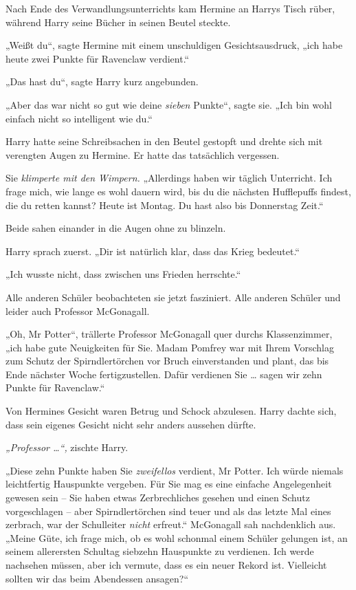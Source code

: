 {Nach Ende des Verwandlungsunterrichts kam Hermine an Harrys Tisch rüber, während Harry seine Bücher in seinen Beutel steckte.

„Weißt du“, sagte Hermine mit einem unschuldigen Gesichtsausdruck, „ich habe heute zwei Punkte für Ravenclaw verdient.“

„Das hast du“, sagte Harry kurz angebunden.

„Aber das war nicht so gut wie deine \emph{sieben} Punkte“, sagte sie. „Ich bin wohl einfach nicht so intelligent wie du.“

Harry hatte seine Schreibsachen in den Beutel gestopft und drehte sich mit verengten Augen zu Hermine. Er hatte das tatsächlich vergessen.

Sie \emph{klimperte mit den Wimpern.} „Allerdings haben wir täglich Unterricht. Ich frage mich, wie lange es wohl dauern wird, bis du die nächsten Hufflepuffs findest, die du retten kannst? Heute ist Montag. Du hast also bis Donnerstag Zeit.“

Beide sahen einander in die Augen ohne zu blinzeln.

Harry sprach zuerst. „Dir ist natürlich klar, dass das Krieg bedeutet.“

„Ich wusste nicht, dass zwischen uns Frieden herrschte.“

Alle anderen Schüler beobachteten sie jetzt fasziniert. Alle anderen Schüler und leider auch Professor McGonagall.

„Oh, Mr Potter“, trällerte Professor McGonagall quer durchs Klassenzimmer, „ich habe gute Neuigkeiten für Sie. Madam Pomfrey war mit Ihrem Vorschlag zum Schutz der Spirndlertörchen vor Bruch einverstanden und plant, das bis Ende nächster Woche fertigzustellen. Dafür verdienen Sie … sagen wir zehn Punkte für Ravenclaw.“

Von Hermines Gesicht waren Betrug und Schock abzulesen. Harry dachte sich, dass sein eigenes Gesicht nicht sehr anders aussehen dürfte.

\emph{„Professor …“,} zischte Harry.

„Diese zehn Punkte haben Sie \emph{zweifellos} verdient, Mr Potter. Ich würde niemals leichtfertig Hauspunkte vergeben. Für Sie mag es eine einfache Angelegenheit gewesen sein -- Sie haben etwas Zerbrechliches gesehen und einen Schutz vorgeschlagen -- aber Spirndlertörchen sind teuer und als das letzte Mal eines zerbrach, war der Schulleiter \emph{nicht} erfreut.“ McGonagall sah nachdenklich aus. „Meine Güte, ich frage mich, ob es wohl schonmal einem Schüler gelungen ist, an seinem allerersten Schultag siebzehn Hauspunkte zu verdienen. Ich werde nachsehen müssen, aber ich vermute, dass es ein neuer Rekord ist. Vielleicht sollten wir das beim Abendessen ansagen?“

}
